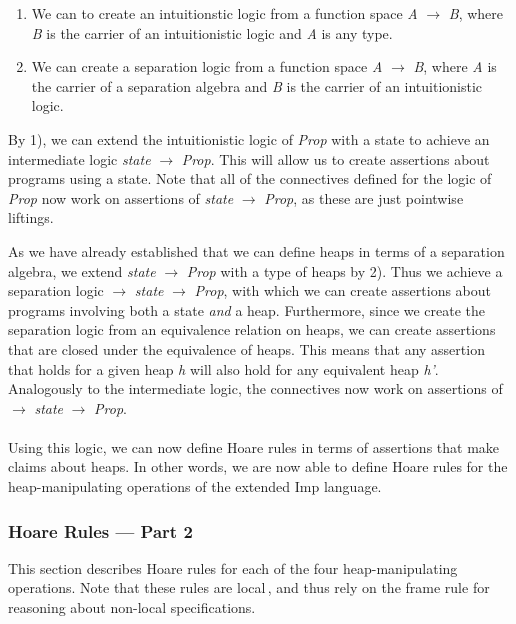 \begin{enumerate}[label=\arabic*)]
\item We can to create an intuitionstic logic from a function space {\it A} $\to$ {\it B}, where {\it B} is the carrier of an intuitionistic logic and {\it A} is any type.
\item We can create a separation logic from a function space {\it A} $\to$ {\it B}, where {\it A} is the carrier of a separation algebra and {\it B} is the carrier of an intuitionistic logic.\,\cite{JBSlides}
\end{enumerate} 

By 1), we can extend the intuitionistic logic of {\it Prop} with a state to achieve an intermediate logic {\it state} $\to$ {\it Prop}. This will allow us to create assertions about programs using a state. Note that all of the connectives defined for the logic of {\it Prop} now work on assertions of {\it state} $\to$ {\it Prop}, as these are just pointwise liftings.

As we have already established that we can define heaps in terms of a separation algebra, we extend {\it state} $\to$ {\it Prop} with a type of heaps by 2). Thus we achieve a separation logic \heap $\to$ {\it state} $\to$ {\it Prop}, with which we can create assertions about programs involving both a state {\it and} a heap. Furthermore, since we create the separation logic from an equivalence relation on heaps, we can create assertions that are closed under the equivalence of heaps. This means that any assertion that holds for a given heap {\it h} will also hold for any equivalent heap {\it h'}. Analogously to the intermediate logic, the connectives now work on assertions of \heap $\to$ {\it state} $\to$ {\it Prop}.

\paragraph{}
Using this logic, we can now define Hoare rules in terms of assertions that make claims about heaps. In other words, we are now able to define Hoare rules for the heap-manipulating operations of the extended Imp language. 


\subsubsection{Hoare Rules --- Part 2}
\label{sec:hoare_rules_heap}
This section describes Hoare rules for each of the four heap-manipulating operations. Note that these rules are local\,\cite{Reynolds02}, and thus rely on the frame rule for reasoning about non-local specifications.
